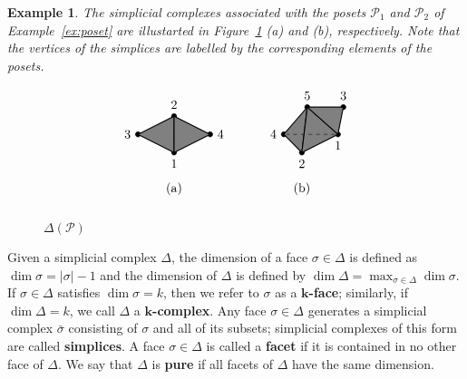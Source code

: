 \documentclass[letterpaper,10pt]{article}
\newtheorem{ex}[theorem]{Example}
\begin{document}
\begin{ex}
The simplicial complexes associated with the posets $\mathcal{P}_1$ and $\mathcal{P}_2$ of Example~\ref{ex:poset} are illustarted in Figure~\ref{fig:simpex} \textup{(a)} and \textup{(b)}, respectively. Note that the vertices of the simplices are labelled by the corresponding elements of the posets.
\begin{figure}[H]
    \centering
    $$\begin{tikzpicture}
	\node (1) at (0, 0) [circle, draw = black, fill = black, inner sep = 0.5mm, label=below:{1}]{};
	\node (2) at (-1, 0.5)[circle, draw = black, fill = black, inner sep = 0.5mm,label=left:{3}] {};
    \node (3) at (0, 1) [circle, draw = black, fill = black, inner sep = 0.5mm,label=above:{2}]{};
    \node (4) at (1, 0.5) [circle, draw = black, fill = black, inner sep = 0.5mm,label=right:{4}]{};
    \draw [fill=gray,thick] (0, 0)--(-1, 0.5)--(0, 1)--(0, 0);
    \draw [fill=gray,thick] (0, 0)--(1, 0.5)--(0, 1)--(0, 0);
    \node (5) at (0, -1) {(a)};
\end{tikzpicture}\quad\quad\quad\begin{tikzpicture}
	\node (2) at (0, 0) [circle, draw = black, fill = black, inner sep = 0.5mm, label=below:{2}]{};
	\node (1) at (1, 0.5)[circle, draw = black, fill = black, inner sep = 0.5mm,label=below:{1}] {};
    \node (3) at (1.15, 1.25) [circle, draw = black, fill = black, inner sep = 0.5mm,label=above:{3}]{};
    \node (4) at (-0.5, 0.5) [circle, draw = black, fill = black, inner sep = 0.5mm,label=left:{4}]{};
    \node (5) at (0.15, 1.25) [circle, draw = black, fill = black, inner sep = 0.5mm,label=above:{5}]{};
    \draw [fill=gray,thick] (-0.5, 0.5)--(0, 0)--(0.15, 1.25)--(-0.5, 0.5);
   \draw [fill=gray,thick] (1, 0.5)--(0, 0)--(0.15, 1.25)--(1, 0.5);
   \draw [fill=gray,thick] (1, 0.5)--(1.15, 1.25)--(0.15, 1.25)--(1, 0.5);
   \draw[dashed] (1)--(4);
    \node (6) at (0, -1) {(b)};
\end{tikzpicture}$$
    \caption{$\Delta(\mathcal{P})$}
    \label{fig:simpex}
\end{figure}
\end{ex}

\noindent
Given a simplicial complex $\Delta$, the dimension of a face $\sigma\in\Delta$ is defined as $\dim\sigma=|\sigma|-1$ and the dimension of $\Delta$ is defined by $\dim\Delta=\max_{\sigma\in \Delta}\dim\sigma$. If $\sigma\in\Delta$ satisfies $\dim\sigma=k$, then we refer to $\sigma$ as a \textbf{$\mathbf{k}$-face}; similarly, if $\dim\Delta=k$, we call $\Delta$ a \textbf{$\mathbf{k}$-complex}. Any face $\sigma\in\Delta$ generates a simplicial complex $\bar{\sigma}$ consisting of $\sigma$ and all of its subsets; simplicial complexes of this form are called \textbf{simplices}. A face $\sigma\in\Delta$ is called a \textbf{facet} if it is contained in no other face of $\Delta$. We say that $\Delta$ is \textbf{pure} if all facets of $\Delta$ have the same dimension. 
\end{document}

